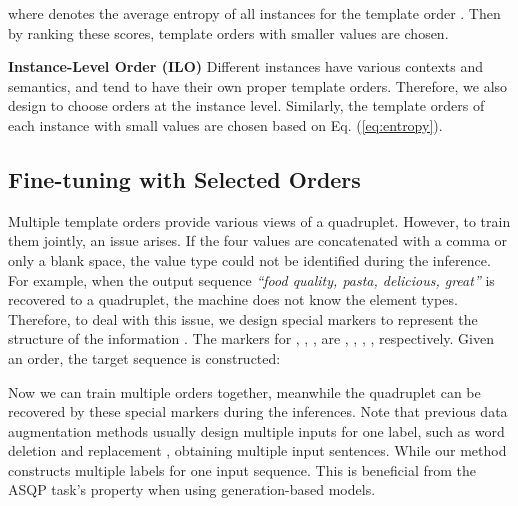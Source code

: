 \documentclass[11pt]{article}
\begin{document}
where  denotes the average entropy of all instances for the template order . Then by ranking these scores, template orders with smaller values are chosen. 

\vspace{6pt}
\noindent
\textbf{Instance-Level Order (ILO)} \; Different instances have various contexts and semantics, and tend to have their own proper template orders. Therefore, we also design to choose orders at the instance level. Similarly, the template orders of each instance with small values are chosen based on Eq. (\ref{eq:entropy}).






\subsection{Fine-tuning with Selected Orders}
Multiple template orders provide various views of a quadruplet. However, to train them jointly, an issue arises. If the four values are concatenated with a comma or only a blank space, the value type could not be identified during the inference. For example, when the output sequence \emph{``food quality, pasta, delicious, great''} is recovered to a quadruplet, the machine does not know the element types. Therefore, to deal with this issue, we design special markers to represent the structure of the information \cite{paolini2021structured}. The markers for , , ,  are , , , , respectively. Given an order, the target sequence is constructed:


Now we can train multiple orders together, meanwhile the quadruplet can be recovered by these special markers during the inferences. Note that previous data augmentation methods usually design multiple inputs for one label, such as word deletion and replacement \cite{gao2021simcse}, obtaining multiple input sentences. While our method constructs multiple labels for one input sequence. This is beneficial from the ASQP task's property when using generation-based models. 
\end{document}
